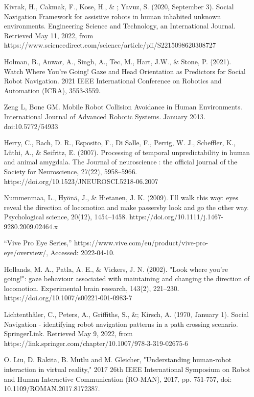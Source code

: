 \documentclass[letterpaper, 10 pt, conference]{ieeeconf}
\begin{document}
\begin{thebibliography}{99}

Kivrak, H., Cakmak, F., Kose, H., \& ; Yavuz, S. (2020, September 3). Social Navigation Framework for assistive robots in human inhabited unknown environments. Engineering Science and Technology, an International Journal. Retrieved May 11, 2022, from https://www.sciencedirect.com/science/article/pii/S2215098620308727 


Holman, B., Anwar, A., Singh, A., Tec, M., Hart, J.W., \& Stone, P. (2021). Watch Where You’re Going! Gaze and Head Orientation as Predictors for Social Robot Navigation. 2021 IEEE International Conference on Robotics and Automation (ICRA), 3553-3559.

Zeng L, Bone GM. Mobile Robot Collision Avoidance in Human Environments. International Journal of Advanced Robotic Systems. January 2013. doi:10.5772/54933


Herry, C., Bach, D. R., Esposito, F., Di Salle, F., Perrig, W. J., Scheffler, K., Lüthi, A., \& Seifritz, E. (2007). Processing of temporal unpredictability in human and animal amygdala. The Journal of neuroscience : the official journal of the Society for Neuroscience, 27(22), 5958–5966. https://doi.org/10.1523/JNEUROSCI.5218-06.2007

Nummenmaa, L., Hyönä, J., \& Hietanen, J. K. (2009). I'll walk this way: eyes reveal the direction of locomotion and make passersby look and go the other way. Psychological science, 20(12), 1454–1458. https://doi.org/10.1111/j.1467-9280.2009.02464.x
  
“Vive Pro Eye Series,” https://www.vive.com/eu/product/vive-pro-
eye/overview/, Accessed: 2022-04-10.

Hollands, M. A., Patla, A. E., \& Vickers, J. N. (2002). "Look where you're going!": gaze behaviour associated with maintaining and changing the direction of locomotion. Experimental brain research, 143(2), 221–230. https://doi.org/10.1007/s00221-001-0983-7

Lichtenthäler, C., Peters, A., Griffiths, S., \&; Kirsch, A. (1970, January 1). Social Navigation - identifying robot navigation patterns in a path crossing scenario. SpringerLink. Retrieved May 9, 2022, from https://link.springer.com/chapter/10.1007/978-3-319-02675-6

O. Liu, D. Rakita, B. Mutlu and M. Gleicher, "Understanding human-robot interaction in virtual reality," 2017 26th IEEE International Symposium on Robot and Human Interactive Communication (RO-MAN), 2017, pp. 751-757, doi: 10.1109/ROMAN.2017.8172387. 


\end{thebibliography}
\end{document}
